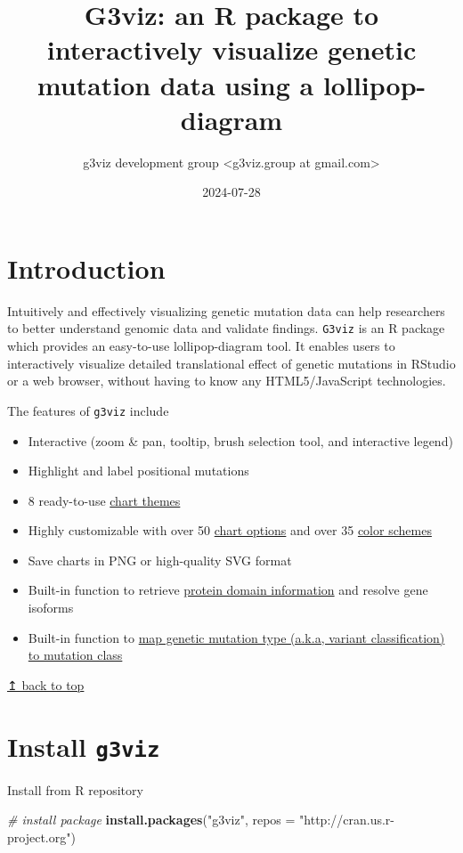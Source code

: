 \documentclass[
]{article}
\title{G3viz: an R package to interactively visualize genetic mutation
data using a lollipop-diagram}
\author{g3viz development group \textless g3viz.group at
gmail.com\textgreater{}}
\date{2024-07-28}
\newenvironment{Shaded}{\begin{snugshade}}{\end{snugshade}}
\newcommand{\AttributeTok}[1]{\textcolor[rgb]{0.13,0.29,0.53}{#1}}
\newcommand{\CommentTok}[1]{\textcolor[rgb]{0.56,0.35,0.01}{\textit{#1}}}
\newcommand{\FunctionTok}[1]{\textcolor[rgb]{0.13,0.29,0.53}{\textbf{#1}}}
\newcommand{\NormalTok}[1]{#1}
\newcommand{\StringTok}[1]{\textcolor[rgb]{0.31,0.60,0.02}{#1}}
\providecommand{\tightlist}{%
  \setlength{\itemsep}{0pt}\setlength{\parskip}{0pt}}
\begin{document}
\maketitle

\section{Introduction}\label{introduction}

Intuitively and effectively visualizing genetic mutation data can help
researchers to better understand genomic data and validate findings.
\texttt{G3viz} is an R package which provides an easy-to-use
lollipop-diagram tool. It enables users to interactively visualize
detailed translational effect of genetic mutations in RStudio or a web
browser, without having to know any HTML5/JavaScript technologies.

The features of \texttt{g3viz} include

\begin{itemize}
\tightlist
\item
  Interactive (zoom \& pan, tooltip, brush selection tool, and
  interactive legend)
\item
  Highlight and label positional mutations
\item
  8 ready-to-use \hyperref[themes]{chart themes}
\item
  Highly customizable with over 50 \hyperref[options]{chart options} and
  over 35 \hyperref[schemes]{color schemes}
\item
  Save charts in PNG or high-quality SVG format
\item
  Built-in function to retrieve \hyperref[pfam]{protein domain
  information} and resolve gene isoforms
\item
  Built-in function to \hyperref[mutation]{map genetic mutation type
  (a.k.a, variant classification) to mutation class}
\end{itemize}

\hyperref[top]{↥ back to top}

\section{\texorpdfstring{Install
\texttt{g3viz}}{Install g3viz}}\label{install-g3viz}

Install from R repository

\begin{Shaded}
\begin{Highlighting}[]
\CommentTok{\# install package}
\FunctionTok{install.packages}\NormalTok{(}\StringTok{"g3viz"}\NormalTok{, }\AttributeTok{repos =} \StringTok{"http://cran.us.r{-}project.org"}\NormalTok{)}
\end{Highlighting}
\end{Shaded}
\end{document}
